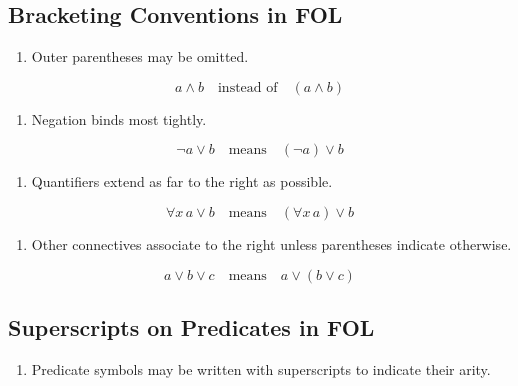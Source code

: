 \documentclass[12pt,a4paper,openany]{article}
\begin{document}
\subsection{Bracketing Conventions in
FOL}\label{bracketing-conventions-in-fol}

\begin{enumerate}
\def\labelenumi{\arabic{enumi}.}

\item
  Outer parentheses may be omitted.
\end{enumerate}

\[
  a \land b \quad \text{instead of} \quad (a \land b)
  \]

\begin{enumerate}
\def\labelenumi{\arabic{enumi}.}
\setcounter{enumi}{1}

\item
  Negation binds most tightly.
\end{enumerate}

\[
  \lnot a \lor b \quad \text{means} \quad (\lnot a) \lor b
  \]

\begin{enumerate}
\def\labelenumi{\arabic{enumi}.}
\setcounter{enumi}{2}

\item
  Quantifiers extend as far to the right as possible.
\end{enumerate}

\[
  \forall x \, a \lor b \quad \text{means} \quad (\forall x \, a) \lor b
  \]

\begin{enumerate}
\def\labelenumi{\arabic{enumi}.}
\setcounter{enumi}{3}

\item
  Other connectives associate to the right unless parentheses indicate
  otherwise.
\end{enumerate}

\[
  a \lor b \lor c \quad \text{means} \quad a \lor (b \lor c)
  \]

\subsection{Superscripts on Predicates in
FOL}\label{superscripts-on-predicates-in-fol}

\begin{enumerate}
\def\labelenumi{\arabic{enumi}.}

\item
  Predicate symbols may be written with superscripts to indicate their
  arity.
\end{enumerate}
\end{document}
